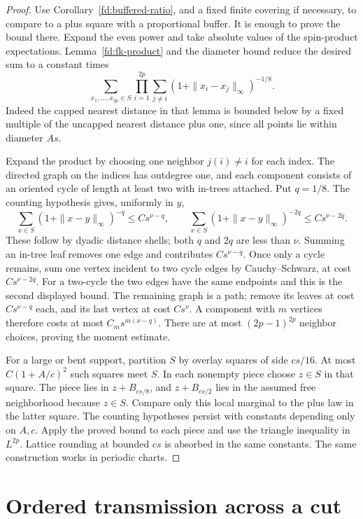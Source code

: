 \documentclass[11pt]{article}
\theoremstyle{definition}
\theoremstyle{remark}
\numberwithin{equation}{section}
\begin{document}
\begin{proof}
Use Corollary~\ref{fd:buffered-ratio}, and a fixed finite covering if
necessary, to compare to a plus square with a proportional buffer.
It is enough to prove the bound there.  Expand the even power and take
absolute values of the spin-product expectations.  Lemma~\ref{fd:fk-product}
and the diameter bound reduce the desired sum to a constant times
\[
 \sum_{x_1,\ldots,x_{2p}\in S}
 \prod_{i=1}^{2p}
       \sum_{j\ne i}(1+\|x_i-x_j\|_\infty)^{-1/8}.
\]
Indeed the capped nearest distance in that lemma is bounded below by
a fixed multiple of the uncapped nearest distance plus one, since all
points lie within diameter \(As\).

Expand the product by choosing one neighbor \(j(i)\ne i\) for each
index.  The directed graph on the indices has outdegree one, and each
component consists of an oriented cycle of length at least two with
in-trees attached.  Put \(q=1/8\).  The counting hypothesis gives, uniformly
in \(y\),
\[
 \sum_{x\in S}(1+\|x-y\|_\infty)^{-q}
       \le C s^{\nu-q},
 \qquad
 \sum_{x\in S}(1+\|x-y\|_\infty)^{-2q}
       \le C s^{\nu-2q}.
\]
These follow by dyadic distance shells; both \(q\) and \(2q\) are less
than \(\nu\).  Summing an in-tree leaf removes one edge and contributes
\(Cs^{\nu-q}\).  Once only a cycle remains, sum one vertex incident to
two cycle edges by Cauchy--Schwarz, at cost \(Cs^{\nu-2q}\).
For a two-cycle the two edges have the same endpoints and this is the
second displayed bound.  The remaining graph is a path; remove its leaves
at cost \(Cs^{\nu-q}\) each, and its last vertex at cost \(Cs^\nu\).
A component with \(m\) vertices therefore costs at most
\(C_m s^{m(\nu-q)}\).  There are at most \((2p-1)^{2p}\) neighbor
choices, proving the moment estimate.

For a large or bent support, partition \(S\) by overlay squares of
side \(cs/16\).  At most \(C(1+A/c)^2\) such squares meet
\(S\).  In each nonempty piece choose \(z\in S\) in that square.
The piece lies in \(z+B_{cs/8}\), and \(z+B_{cs/2}\) lies in the
assumed free neighborhood because \(z\in S\).  Compare only this
local marginal to the plus law in the latter square.  The counting
hypotheses persist with constants depending only on \(A,c\).  Apply
the proved bound to each piece and use the triangle inequality in
\(L^{2p}\).  Lattice rounding at bounded \(cs\) is absorbed in the
same constants.  The same construction works in periodic charts.
\end{proof}

\section{Ordered transmission across a cut}\label{tr:section}
\end{document}
